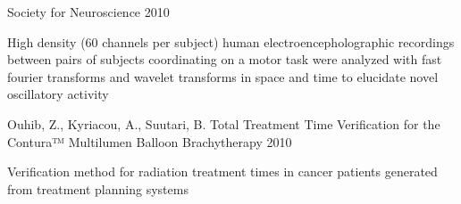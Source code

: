 \begin{cventries}
{Society for Neuroscience} %
{2010} %
{ %
\begin{cvitems}
\item {High density (60 channels per subject) human electroencepholographic recordings between pairs of subjects coordinating on a motor task were analyzed with fast fourier transforms and wavelet transforms in space and time to elucidate novel oscillatory activity}
\end{cvitems}
}
\cventry
{Ouhib, Z., Kyriacou, A., Suutari, B.} %
{Total Treatment Time Verification for the Contura™ Multilumen Balloon} %
{Brachytherapy} %
{2010} %
{ %
\begin{cvitems}
\item {Verification method for radiation treatment times in cancer patients generated from treatment planning systems}
\end{cvitems}
}




\end{cventries}
